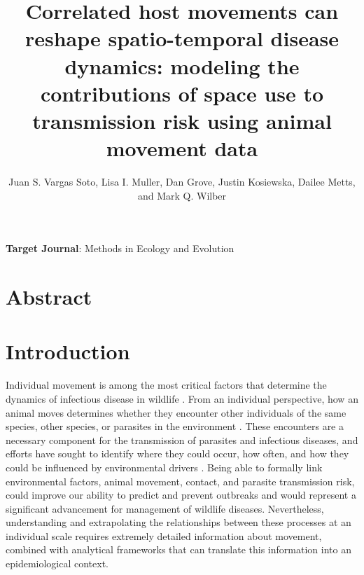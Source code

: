 \documentclass[letterpaper]{article}
\title{Correlated host movements can reshape spatio-temporal disease dynamics: modeling the contributions of space use to transmission risk using animal movement data}
\author{Juan S. Vargas Soto, Lisa I. Muller, Dan Grove, Justin Kosiewska, Dailee Metts, and Mark Q. Wilber}
\affil{School of Natural Resources, University of Tennessee, Knoxville, TN}
\date{}
\begin{document}
\maketitle

\noindent
\textbf{Target Journal}: Methods in Ecology and Evolution

\section*{Abstract}

\section*{Introduction}



Individual movement is among the most critical factors that determine the dynamics of infectious disease in wildlife \citep{Dougherty2018,Manlove2022}. 
From an individual perspective, how an animal moves determines whether they encounter other individuals of the same species, other species, or parasites in the environment \citep{Martinez-Garcia2020,Das2023}. 
These encounters are a necessary component for the transmission of parasites and infectious diseases, and efforts have sought to identify where they could occur, how often, and how they could be influenced by environmental drivers \citep{Titcomb2021,Dougherty2022}. 
Being able to formally link environmental factors, animal movement, contact, and parasite transmission risk, could improve our ability to predict and prevent outbreaks and would represent a significant advancement for management of wildlife diseases.  
Nevertheless, understanding and extrapolating the relationships between these processes at an individual scale requires extremely detailed information about movement, combined with analytical frameworks that can translate this information into an epidemiological context.
\end{document}
